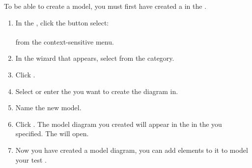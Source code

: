 

To be able to create a model, you must first have created a \gdproject{} in the \gdnavview{} . 

\begin{enumerate}
\item In the \gdnavview{}, click the  button select:\\
\\
from the context-sensitive menu. 
\item In the wizard that appears, select  from the  category. 
\item Click . 
\item Select or enter the \gdproject{} you want to create the diagram in. 
\item Name the new model. 
\item Click . The model diagram you created will appear in the \gdnavview{} in the \gdproject{} you specified. The \gdmodeleditor{} will open. \item Now you have created a model diagram, you can add elements to it to model your test . 
\end{enumerate}

